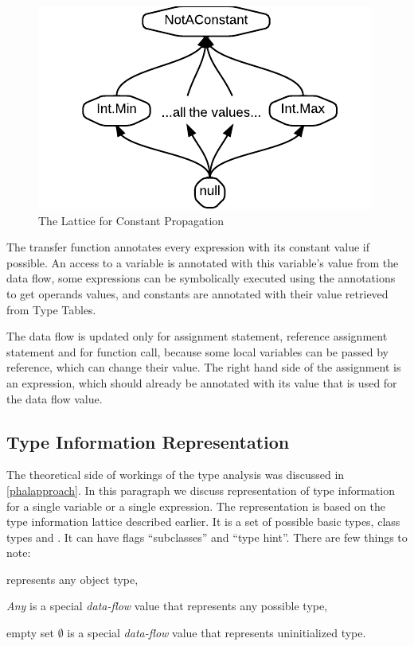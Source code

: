 \begin{figure}[h]  
  \centering
    \includegraphics{img/ConstLattice.pdf}  
    \caption{The Lattice for Constant Propagation\label{constlattice}}
\end{figure}        
        
        The transfer function annotates every expression 
        with its constant value if possible. An access to a 
        variable is annotated with this variable's value 
        from the data flow, some expressions can be symbolically 
        executed using the annotations to get operands values, 
        and constants are annotated with their value retrieved 
        from Type Tables.
        
        The data flow is updated only for assignment statement, 
        reference assignment statement and for function call, 
        because some local variables can be passed by reference, 
        which can change their value. The right hand side of 
        the assignment is an expression, which should already be 
        annotated with its value that is used for the data 
        flow value.

    \subsection{Type Information Representation}        
        The theoretical side of workings of the type analysis was 
        discussed in \wsection{} \ref{phalapproach}.         
        In this paragraph we discuss representation of 
        type information for a single variable or a single expression. 
        The representation is based on the type information 
        lattice described earlier. It is a set of possible 
        basic types, class types and . It can 
        have flags ``subclasses'' and ``type hint''. 
        There are few things to note:
        \begin{itemize*}
            \item {} represents any object type, 
            \item \emph{Any} is a special \emph{data-flow} value that 
                represents any possible type, 
            \item empty set $\emptyset$  is a special \emph{data-flow} value that 
                represents uninitialized type.
        \end{itemize*}
        
